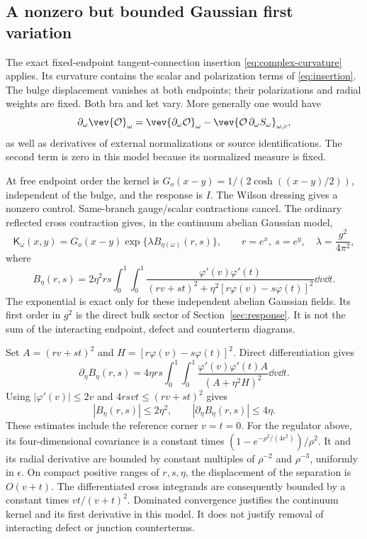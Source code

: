 \subsection{A nonzero but bounded Gaussian first variation}
\label{subsec:gaussian-readout}

The exact fixed-endpoint tangent-connection insertion
\eqref{eq:complex-curvature} applies. Its curvature contains
the scalar and polarization terms of
\eqref{eq:insertion}. The bulge displacement vanishes at
both endpoints; their polarizations and radial weights are
fixed. Both bra and ket vary. More generally one would have
\[
 \partial_\omega\vev{\mathcal O}_\omega
 =\vev{\partial_\omega\mathcal O}_\omega
 -\vev{\mathcal O\,\partial_\omega S_\omega}_{\omega,c},
\]
as well as derivatives of external normalizations or source
identifications. The second term is zero in this model
because its normalized measure is fixed.

At free endpoint order the kernel is
$G_o(x-y)=1/(2\cosh((x-y)/2))$, independent of the bulge,
and the response is $I$. The Wilson dressing gives a nonzero
control. Same-branch gauge/scalar contractions cancel.
The ordinary reflected cross contraction gives, in the
continuum abelian Gaussian model,
\begin{equation}\label{eq:gaussian-kernel}
 \mathsf K_\omega(x,y)=G_o(x-y)
 \exp\{\lambda B_{\eta(\omega)}(r,s)\},
 \qquad r=e^x,\ s=e^y,\quad\lambda=\frac{g^2}{4\pi^2},
\end{equation}
where
\begin{equation}\label{eq:unequal-bulge}
 B_\eta(r,s)=2\eta^2rs\int_0^1\!\int_0^1
 \frac{\varphi'(v)\varphi'(t)}
 {(rv+st)^2+\eta^2[r\varphi(v)-s\varphi(t)]^2}
 \dd v\dd t.
\end{equation}
The exponential is exact only for these independent abelian
Gaussian fields. Its first order in $g^2$ is the direct bulk
sector of Section~\ref{sec:response}. It is not the sum of
the interacting endpoint, defect and counterterm diagrams.

Set $A=(rv+st)^2$ and
$H=[r\varphi(v)-s\varphi(t)]^2$. Direct differentiation gives
\begin{equation}\label{eq:unequal-bulge-derivative}
 \partial_\eta B_\eta(r,s)=4\eta rs
 \int_0^1\!\int_0^1
 \frac{\varphi'(v)\varphi'(t)A}{(A+\eta^2H)^2}
 \dd v\dd t.
\end{equation}
Using $|\varphi'(v)|\le2v$ and
$4rsvt\le(rv+st)^2$ gives
\begin{equation}\label{eq:bulge-uniform-bounds}
 |B_\eta(r,s)|\le2\eta^2,\qquad
 |\partial_\eta B_\eta(r,s)|\le4\eta.
\end{equation}
These estimates include the reference corner $v=t=0$.
For the regulator above, its four-dimensional covariance is
a constant times $(1-e^{-\rho^2/(4\epsilon^2)})/\rho^2$.
It and its radial derivative are bounded by constant
multiples of $\rho^{-2}$ and $\rho^{-3}$, uniformly in
$\epsilon$. On compact positive ranges of $r,s,\eta$,
the displacement of the separation is $O(v+t)$.
The differentiated cross integrands are consequently bounded
by a constant times $vt/(v+t)^2$. Dominated convergence
justifies the continuum kernel and its first derivative in
this model. It does not justify removal of interacting
defect or junction counterterms.


